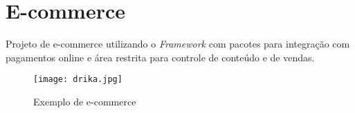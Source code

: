         \emph{}

        \emph{}


    \section{E-commerce\label{sec:e-commerce}}

        Projeto de e-commerce utilizando o \emph{Framework} com pacotes para integração com pagamentos online e área restrita para controle de conteúdo e de vendas.

        \begin{figure}[!htb]
            \centering
            \texttt{[image: drika.jpg]}
            \caption{\small Exemplo de e-commerce}
            \label{cap:sass}
        \end{figure}